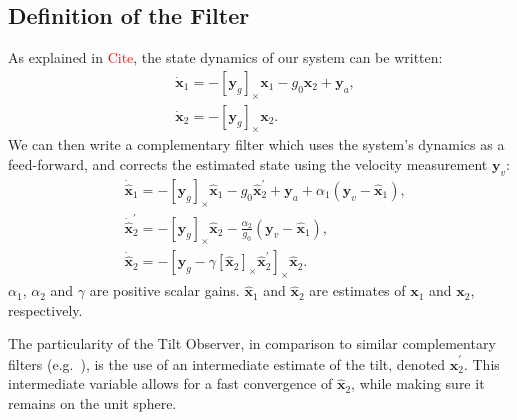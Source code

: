 \documentclass{IJCAS}
\begin{document}
\subsection{Definition of the Filter}
As explained in \textcolor{red}{Cite}, the state dynamics of our system can be written:
\begin{align} 
&\dot{\boldsymbol{x}}_{1} = -\left[\boldsymbol{y}_{g}\right]_{\times} \boldsymbol{x}_{1} - g_{0}\boldsymbol{x}_{2} + \boldsymbol{y}_{a} , \label{eq:x1_dot} \\
&\dot{\boldsymbol{x}}_{2} = -\left[\boldsymbol{y}_{g}\right]_{\times} \boldsymbol{x}_{2}. \label{eq:x2_dot}
\end{align} 
We can then write a complementary filter which uses the system's dynamics as a feed-forward, and corrects the estimated state using the velocity measurement $\boldsymbol{y}_{v}$:
\begin{align} 
& \dot{\hat{\boldsymbol{x}}}_{1}  = - \left[\boldsymbol{y}_{g}\right]_{\times}\hat{\boldsymbol{x}}_{1} - g_{0} \hat{\boldsymbol{x}}_{2}^{\prime} + \boldsymbol{y}_{a} + \alpha_{1} \left(\boldsymbol{y}_{v} - \hat{\boldsymbol{x}}_{1}\right), \label{x1_dot} \\
    & \dot{\hat{\boldsymbol{x}}}_{2}^{\prime} = - \left[\boldsymbol{y}_{g}\right]_{\times} \hat{\boldsymbol{x}}_{2} - \frac{\alpha_{2}}{g_{0}} \left(\boldsymbol{y}_{v} - \hat{\boldsymbol{x}}_{1}\right), \\
    & \dot{\hat{\boldsymbol{x}}}_{2} = - \left[\boldsymbol{y}_{g} - \gamma \left[\hat{\boldsymbol{x}}_{2}\right]_{\times}\hat{\boldsymbol{x}}_{2}^{\prime}\right]_{\times} \hat{\boldsymbol{x}}_{2}.
\end{align} 
$\alpha_1$, $\alpha_2$ and $\gamma$ are positive scalar gains. $\hat{\boldsymbol{x}}_{1} $ and $\hat{\boldsymbol{x}}_{2} $ are estimates of $\boldsymbol{x}_{1} $ and $\boldsymbol{x}_{2} $, respectively. 

The particularity of the Tilt Observer, in comparison to similar complementary filters (e.g.~\cite{martin2016AGlobExpObsVelocityAidedAttitude}), is the use of an intermediate estimate of the tilt, denoted $\hat{\boldsymbol{x}}_{2}^{\prime}$. This intermediate variable allows for a fast convergence of $\hat{\boldsymbol{x}}_{2}$, while making sure it remains on the unit sphere. 
\end{document}
